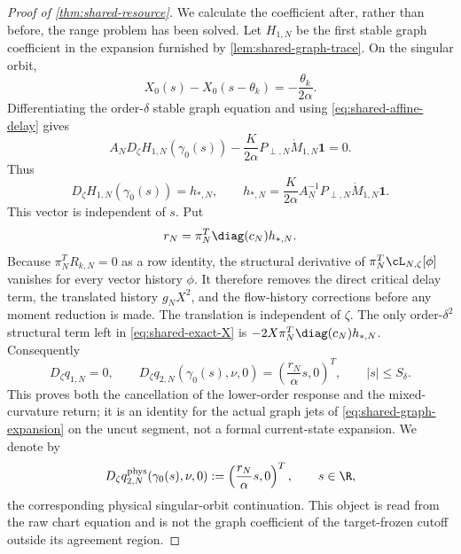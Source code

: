 \begin{proof}[Proof of \cref{thm:shared-resource}]
We calculate the coefficient after, rather than before, the range problem
has been solved.  Let \(H_{1,N}\) be the first stable graph coefficient in
the expansion furnished by \cref{lem:shared-graph-trace}.  On the singular
orbit,
\begin{equation}
 X_0(s)-X_0(s-\theta_k)=-\frac{\theta_k}{2\alpha}.
                                                               \label{eq:shared-affine-delay}
\end{equation}
Differentiating the order-\(\delta\) stable graph equation and using
\cref{eq:shared-affine-delay} gives
\[
 A_ND_\zeta H_{1,N}(\gamma_0(s))
 -\frac{K}{2\alpha}P_{\perp,N}\dot M_{1,N}\mathbf1=0.
\]
Thus
\begin{equation}
 D_\zeta H_{1,N}(\gamma_0(s))=h_{*,N},\qquad
 h_{*,N}=\frac{K}{2\alpha}A_N^{-1}P_{\perp,N}
             \dot M_{1,N}\mathbf1.                  \label{eq:hstar-rn-a}
\end{equation}
This vector is independent of \(s\).  Put
\begin{equation}
 r_N=\pi_N^T\diag(c_N)h_{*,N}.                         \label{eq:hstar-rn}
\end{equation}
Because \(\pi_N^TR_{k,N}=0\) as a row identity, the structural derivative
of \(\pi_N^T\cL_{N,\zeta}[\phi]\) vanishes for every vector history
\(\phi\).  It therefore removes the direct critical delay term, the
translated history \(g_NX^2\), and the flow-history corrections before any
moment reduction is made.  The translation is independent of \(\zeta\).
The only order-\(\delta^2\) structural term left in
\cref{eq:shared-exact-X} is
\(-2X\pi_N^T\diag(c_N)h_{*,N}\).  Consequently
\begin{equation}
 D_\zeta q_{1,N}=0,\qquad
 D_\zeta q_{2,N}(\gamma_0(s),\nu,0)
   =\left(\frac{r_N}{\alpha}s,0\right)^T,\qquad |s|\le S_\delta.
                                                               \label{eq:q2-return}
\end{equation}
This proves both the cancellation of the lower-order response and the
mixed-curvature return; it is an identity for the actual graph jets of
\cref{eq:shared-graph-expansion} on the uncut segment, not a formal
current-state expansion.  We denote by
\begin{equation}
 D_\zeta q^{\rm phys}_{2,N}(\gamma_0(s),\nu,0)
 :=\left(\frac{r_N}{\alpha}s,0\right)^T,\qquad s\in\R,
                                                               \label{eq:q2-physical-continuation}
\end{equation}
the corresponding physical singular-orbit continuation.  This object is
read from the raw chart equation and is not the graph coefficient of the
target-frozen cutoff outside its agreement region.


\end{proof}

